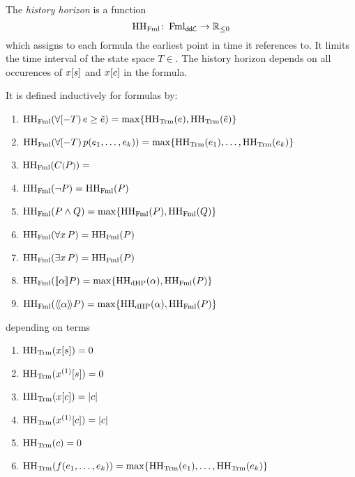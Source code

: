         \begin{definition}
            The \emph{history horizon} is a function
            \begin{equation*}
                \operatorname{HH_{\operatorname{Fml}}}\colon \operatorname{Fml}_{\textsf{d{\kern-0.07em}d{\kern-0.1em}$\mathcal{L}$}} \to \mathbb{R}_{\leq 0}
            \end{equation*}
            which assigns to each \ddL formula the earliest point in time it references to. It limits the time interval of the state space $T\in$.
            The history horizon depends on all occurences of $x[s]$ and $x[c]$ in the formula.

            It is defined inductively for formulas by:
            \begin{enumerate}
                \item $\HHfml(\hs{\astrm\geq\bstrm}) = \max\set{\HHtrm(\astrm),\HHtrm(\bstrm)}$
                \item $\HHfml(\hs{p(\range{\istrm{1}}{\istrm{k}})}) = \max\set{\range{\HHtrm(\istrm{1})}{\HHtrm(\istrm{k})}}$
                \item $\operatorname{HH_{\operatorname{Fml}}}(C\text{\footnotesize$($}P\text{\footnotesize$)$}) = $
                \item $\operatorname{HH_{\operatorname{Fml}}}(\lnot P) = \operatorname{HH_{\operatorname{Fml}}}(P)$
                \item $\HHfml(\asfml\land\bsfml) = \max\set{\HHfml(\asfml),\HHfml(\bsfml)}$
                \item $\operatorname{HH_{\operatorname{Fml}}}(\forall x{\,} P) = \operatorname{HH_{\operatorname{Fml}}}(P)$
                \item $\operatorname{HH_{\operatorname{Fml}}}(\exists x{\,} P) = \operatorname{HH_{\operatorname{Fml}}}(P)$
                \item $\HHfml(\dbox{\asprg}{\asfml}) = \max\set{\HHprg(\asprg),\HHfml(\asfml)}$
                \item $\HHfml(\ddiamond{\asprg}{\asfml}) = \max\set{\HHprg(\asprg),\HHfml(\asfml)}$
            \end{enumerate}
            depending on terms
            \begin{enumerate}
                \item $\operatorname{HH_{\operatorname{Trm}}}(x[s]) = 0$
                \item $\HHtrm(\Dx[s]) = 0$
                \item $\operatorname{HH_{\operatorname{Trm}}}(x[c]) = \lvert c\rvert$
                \item $\HHtrm(\Dx[c]) = \abs{c}$
                \item $\operatorname{HH_{\operatorname{Trm}}}(c) = 0$
                \item $\HHtrm(f(\range{\istrm{1}}{\istrm{k}})) = \max\set{\range{\HHtrm(\istrm{1})}{\HHtrm(\istrm{k})}}$

\end{enumerate}
\end{definition}
